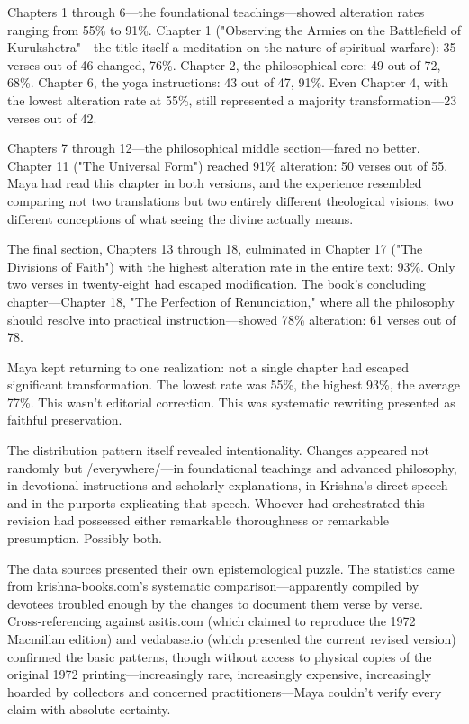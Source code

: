 \documentclass[12pt,twoside]{book}
\begin{document}
Chapters 1 through 6—the foundational teachings—showed alteration rates ranging from 55\% to 91\%. Chapter 1 ("Observing the Armies on the Battlefield of Kurukshetra"—the title itself a meditation on the nature of spiritual warfare): 35 verses out of 46 changed, 76\%. Chapter 2, the philosophical core: 49 out of 72, 68\%. Chapter 6, the yoga instructions: 43 out of 47, 91\%. Even Chapter 4, with the lowest alteration rate at 55\%, still represented a majority transformation—23 verses out of 42.

Chapters 7 through 12—the philosophical middle section—fared no better. Chapter 11 ("The Universal Form") reached 91\% alteration: 50 verses out of 55. Maya had read this chapter in both versions, and the experience resembled comparing not two translations but two entirely different theological visions, two different conceptions of what seeing the divine actually means.

The final section, Chapters 13 through 18, culminated in Chapter 17 ("The Divisions of Faith") with the highest alteration rate in the entire text: 93\%. Only two verses in twenty-eight had escaped modification. The book's concluding chapter—Chapter 18, "The Perfection of Renunciation," where all the philosophy should resolve into practical instruction—showed 78\% alteration: 61 verses out of 78.

Maya kept returning to one realization: not a single chapter had escaped significant transformation. The lowest rate was 55\%, the highest 93\%, the average 77\%. This wasn't editorial correction. This was systematic rewriting presented as faithful preservation.

The distribution pattern itself revealed intentionality. Changes appeared not randomly but /everywhere/—in foundational teachings and advanced philosophy, in devotional instructions and scholarly explanations, in Krishna's direct speech and in the purports explicating that speech. Whoever had orchestrated this revision had possessed either remarkable thoroughness or remarkable presumption. Possibly both.

The data sources presented their own epistemological puzzle. The statistics came from krishna-books.com's systematic comparison—apparently compiled by devotees troubled enough by the changes to document them verse by verse. Cross-referencing against asitis.com (which claimed to reproduce the 1972 Macmillan edition) and vedabase.io (which presented the current revised version) confirmed the basic patterns, though without access to physical copies of the original 1972 printing—increasingly rare, increasingly expensive, increasingly hoarded by collectors and concerned practitioners—Maya couldn't verify every claim with absolute certainty.
\end{document}
